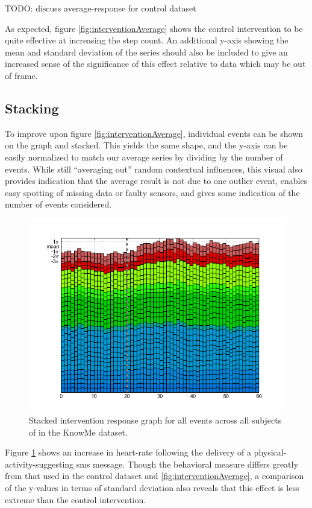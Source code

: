 \documentclass[preprint,journal]{vgtc}       %
\begin{document}
TODO: discuss average-response for control dataset

As expected, figure \ref{fig:interventionAverage} shows the control intervention to be quite effective at increasing the step count.
An additional y-axis showing the mean and standard deviation of the series should also be included to give an increased sense of the significance of this effect relative to data which may be out of frame.

\subsection{Stacking}
To improve upon figure \ref{fig:interventionAverage}, individual events can be shown on the graph and stacked. This yields the same shape, and the y-axis can be easily normalized to match our average series by dividing by the number of events.
While still “averaging out” random contextual influences, this visual also provides indication that the average result is not due to one outlier event, enables easy spotting of missing data or faulty sensors, and gives some indication of the number of events considered.

\begin{figure}
\centering
\includegraphics[width=0.9\columnwidth]{./img/knowMe_sms_intervention.png}
\caption{Stacked intervention response graph for all events across all subjects of in the KnowMe dataset.}
\label{fig:knowMe_stacked}
\end{figure}

Figure \ref{fig:knowMe_stacked} shows an increase in heart-rate following the delivery of a physical-activity-suggesting sms message. Though the behavioral measure differs greatly from that used in the control dataset and \ref{fig:interventionAverage}, a comparison of the y-values in terms of standard deviation also reveals that this effect is less extreme than the control intervention. 
\end{document}

